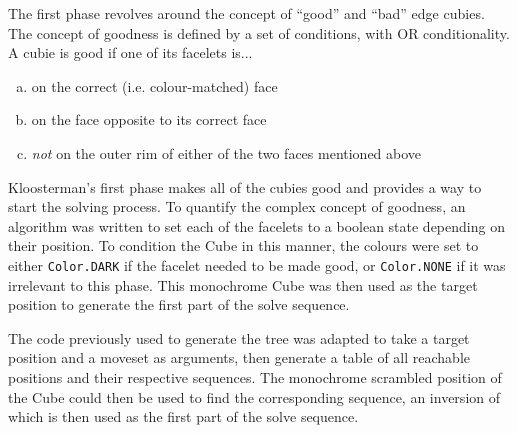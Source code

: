 \documentclass{report}
\newcommand{\tit}[1]{\textit{#1}}
\begin{document}
	The first phase revolves around the concept of \enquote{good} and \enquote{bad} edge cubies. The concept of goodness is defined by a set of conditions, with OR conditionality. A cubie is good if one of its facelets is...
	
	\begin{enumerate}[a)]
		\item on the correct (i.e. colour-matched) face
		\item on the face opposite to its correct face
		\item \tit{not} on the outer rim of either of the two faces mentioned above
	\end{enumerate}

	Kloosterman's first phase makes all of the cubies good and provides a way to start the solving process. To quantify the complex concept of goodness, an algorithm was written to set each of the facelets to a boolean state depending on their position. To condition the Cube in this manner, the colours were set to either \lstinline|Color.DARK| if the facelet needed to be made good, or \lstinline|Color.NONE| if it was irrelevant to this phase. This monochrome Cube was then used as the target position to generate the first part of the solve sequence.
	
	The code previously used to generate the tree was adapted to take a target position and a moveset as arguments, then generate a table of all reachable positions and their respective sequences. The monochrome scrambled position of the Cube could then be used to find the corresponding sequence, an inversion of which is then used as the first part of the solve sequence.
	
\end{document}
